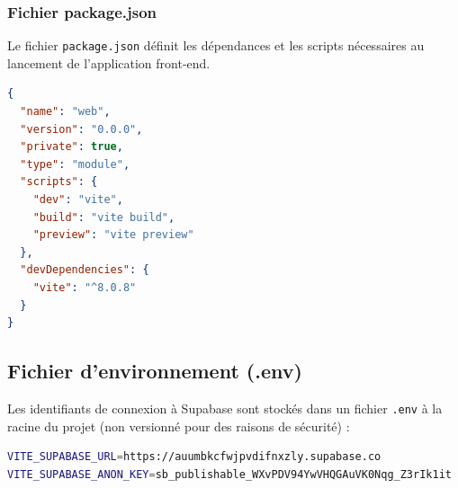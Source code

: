 \documentclass[12pt,a4paper]{report}
\begin{document}
\subsubsection{Fichier package.json}

Le fichier \texttt{package.json} définit les dépendances et les scripts nécessaires au lancement de l'application front-end.

\begin{lstlisting}[language=JSON, captionpos=b,caption={package.json - Configuration Vite}]
{
  "name": "web",
  "version": "0.0.0",
  "private": true,
  "type": "module",
  "scripts": {
    "dev": "vite",
    "build": "vite build",
    "preview": "vite preview"
  },
  "devDependencies": {
    "vite": "^8.0.8"
  }
}
\end{lstlisting}

\subsection{Fichier d'environnement (.env)}

Les identifiants de connexion à Supabase sont stockés dans un fichier \texttt{.env} à la racine du projet (non versionné pour des raisons de sécurité) :

\begin{lstlisting}[language=bash, captionpos=b, caption={.env - Variables d'environnement}]
VITE_SUPABASE_URL=https://auumbkcfwjpvdifnxzly.supabase.co
VITE_SUPABASE_ANON_KEY=sb_publishable_WXvPDV94YwVHQGAuVK0Nqg_Z3rIk1it
\end{lstlisting}
\end{document}
